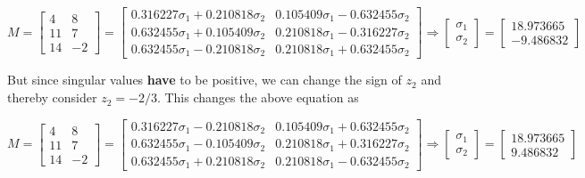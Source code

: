 \begin{equation}
    M = \begin{bmatrix}
        4 & 8 \\
        11 & 7 \\
        14 & -2
        \end{bmatrix} = \begin{bmatrix}
        0.316227 \sigma_1 + 0.210818 \sigma_2 & 0.105409 \sigma_1 - 0.632455 \sigma_2 \\
        0.632455 \sigma_1 + 0.105409 \sigma_2 & 0.210818 \sigma_1 - 0.316227 \sigma_2 \\
        0.632455 \sigma_1 - 0.210818 \sigma_2 & 0.210818 \sigma_1 + 0.632455 \sigma_2
        \end{bmatrix} \Rightarrow \begin{bmatrix}
        \sigma_1 \\ \sigma_2
        \end{bmatrix} = \begin{bmatrix}
        18.973665 \\ -9.486832
        \end{bmatrix}
        \nonumber
\end{equation}

But since singular values \textbf{have} to be positive, we can change the sign of $z_2$ and thereby consider $z_2 = -2/3$. This changes the above equation as

\begin{equation}
    M = \begin{bmatrix}
        4 & 8 \\
        11 & 7 \\
        14 & -2
        \end{bmatrix} = \begin{bmatrix}
        0.316227 \sigma_1 - 0.210818 \sigma_2 & 0.105409 \sigma_1 + 0.632455 \sigma_2 \\
        0.632455 \sigma_1 - 0.105409 \sigma_2 & 0.210818 \sigma_1 + 0.316227 \sigma_2 \\
        0.632455 \sigma_1 + 0.210818 \sigma_2 & 0.210818 \sigma_1 - 0.632455 \sigma_2
        \end{bmatrix} \Rightarrow \begin{bmatrix}
        \sigma_1 \\ \sigma_2
        \end{bmatrix} = \begin{bmatrix}
        18.973665 \\ 9.486832
        \end{bmatrix}
    \nonumber
\end{equation}

